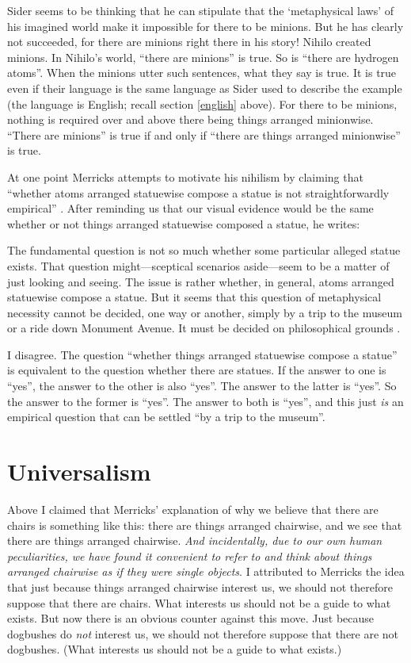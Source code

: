 \documentclass[11pt]{article}
\newenvironment{squote}{%
\begin{spacing}{1}
       	\begin{list}{}{%
\setlength{\labelwidth}{0pt}%
\rightmargin\leftmargin%
}
\item\relax
}{%
\end{list}%
\end{spacing}
}
\begin{document}
\begin{spacing}{1.25}
Sider seems to be thinking that he can stipulate that the
`metaphysical laws' of his imagined world make it impossible for there
to be minions.  But he has clearly not succeeded, for there are
minions right there in his story!  Nihilo created minions.  In
Nihilo's world, ``there are minions'' is true.  So is ``there are
hydrogen atoms''.  When the minions utter such sentences, what they
say is true.  It is true even if their language is the same language
as Sider used to describe the example (the language is English; recall
section \ref{english} above).  For there to be minions, nothing is
required over and above there being things arranged minionwise.
``There are minions'' is true if and only if ``there are things
arranged minionwise'' is true.

At one point Merricks attempts to motivate his nihilism by claiming
that ``whether atoms arranged statuewise compose a statue is not
straightforwardly empirical'' \citeyearpar[9]{merricks2001a}.  After
reminding us that our visual evidence would be the same whether or not
things arranged statuewise composed a statue, he writes:

\begin{squote}
The fundamental question is not so much whether some particular
alleged statue exists.  That question might---sceptical scenarios
aside---seem to be a matter of just looking and seeing.  The issue is
rather whether, in general, atoms arranged statuewise compose a
statue.  But it seems that this question of metaphysical necessity
cannot be decided, one way or another, simply by a trip to the museum
or a ride down Monument Avenue.  It must be decided on philosophical
grounds \citeyearpar[9]{merricks2001a}.
\end{squote}

I disagree.  The question ``whether things arranged statuewise compose
a statue'' is equivalent to the question whether there are statues.
If the answer to one is ``yes'', the answer to the other is also
``yes''.  The answer to the latter is ``yes''.  So the answer to the
former is ``yes''.  The answer to both is ``yes'', and this just {\em
  is} an empirical question that can be settled ``by a trip to the
museum''.

\section{Universalism}
\label{universalism}
Above I claimed that Merricks' explanation of why we believe that
there are chairs is something like this: there are things arranged
chairwise, and we see that there are things arranged chairwise.  {\em
  And incidentally, due to our own human peculiarities, we have found
  it convenient to refer to and think about things arranged chairwise
  as if they were single objects}.  I attributed to Merricks the idea
that just because things arranged chairwise interest us, we should not
therefore suppose that there are chairs.  What interests us should not
be a guide to what exists.  But now there is an obvious counter
against this move.  Just because dogbushes do {\em not} interest us,
we should not therefore suppose that there are not dogbushes.  (What
interests us should not be a guide to what exists.)


\end{spacing}
\end{document}
